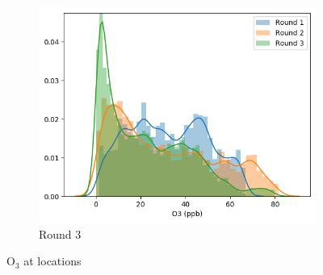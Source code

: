 \documentclass[journal abbreviation, manuscript]{copernicus}
\newcommand{\textus}[1]{$_{\text{#1}}$}
\begin{document}
\begin{figure}[H]
\begin{subfigure}{0.32\textwidth}
\includegraphics[width=\textwidth]{results/distributions/location_shafter_o3.png}
\caption{Round 3}
\end{subfigure}
\caption{O\textus{3} at locations}
\label{fig:o3-locations}
\end{figure}

\fi
\end{document}
